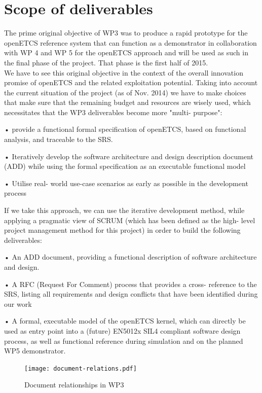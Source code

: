 

\section{Scope of deliverables}

The prime original objective of WP3 was to produce a rapid prototype for the openETCS reference system that can function as a demonstrator in collaboration with WP 4 and WP 5  for the openETCS approach and will be used as such in the final phase of the project. That phase is the first half of 2015. \\

We have to see this original objective in the context of the overall innovation promise of openETCS and the related exploitation potential.
Taking into account the current situation of the project (as of Nov. 2014) we have to make choices that make sure that the remaining budget and resources are wisely used, which necessitates that the WP3 deliverables become more "multi- purpose":

 •  provide a functional formal specification of openETCS, based on functional analysis, and traceable to the SRS.
 
 •  Iteratively develop the software architecture and design description document (ADD) while using the formal specification as an executable functional model
 
 •  Utilise real- world use-case scenarios as early as possible in the development process
 
If we take this approach, we can use the iterative development method, while applying a pragmatic view of SCRUM (which has been defined as the high- level project management method for this project) in order to build the following deliverables:

 •  An ADD document, providing a functional description of software architecture and design.
 
 •  A RFC (Request For Comment) process that provides a cross- reference to the SRS, listing all requirements and design conflicts that have been identified during our work
 
 •  A formal, executable model of the openETCS kernel, which can directly be used as entry point into a (future) EN5012x SIL4 compliant software design process, as well as functional reference during simulation and on the planned WP5 demonstrator.
 
 
\begin{figure}
  \centering
  \texttt{[image: document-relations.pdf]}
  \caption{Document relationships in WP3}
  \label{fig:doc-rels}
\end{figure}

